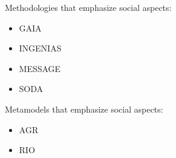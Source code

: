 \documentclass{article}
\begin{document}
Methodologies that emphasize social aspects:
\begin{itemize}
\item GAIA~\cite{journals/aamas/WooldridgeJK00}
\item INGENIAS
\item MESSAGE
\item SODA
\end{itemize}
Metamodels that emphasize social aspects:
\begin{itemize}
\item AGR~\cite{conf/aose/FerberGM03}
\item RIO
\end{itemize}



\end{document}
